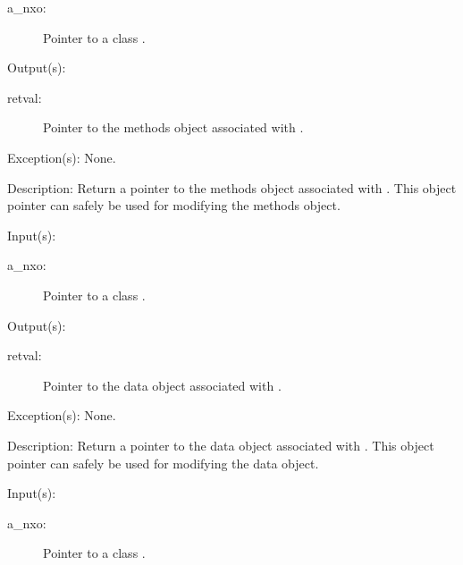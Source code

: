 \begin{capi}
\begin{capilist}
\begin{description}
		\item[a\_nxo: ]
			Pointer to a class .
		\end{description}
	\item[Output(s): ]
		\begin{description}\item[]
		\item[retval: ]
			Pointer to the methods object associated with
			.
		\end{description}
	\item[Exception(s): ] None.
	\item[Description: ]
		Return a pointer to the methods object associated with
		.  This object pointer can safely be used for
		modifying the methods object.
	\end{capilist}
\label{nxo_class_data_get}
	\begin{capilist}
	\item[Input(s): ]
		\begin{description}\item[]
		\item[a\_nxo: ]
			Pointer to a class .
		\end{description}
	\item[Output(s): ]
		\begin{description}\item[]
		\item[retval: ]
			Pointer to the data object associated with
			.
		\end{description}
	\item[Exception(s): ] None.
	\item[Description: ]
		Return a pointer to the data object associated with
		.  This object pointer can safely be used for
		modifying the data object.
	\end{capilist}
\label{nxo_class_opaque_get}
	\begin{capilist}
	\item[Input(s): ]
		\begin{description}\item[]
		\item[a\_nxo: ]
			Pointer to a class \classname{nxo}.
		\end{description}

\end{capilist}
\end{capi}
